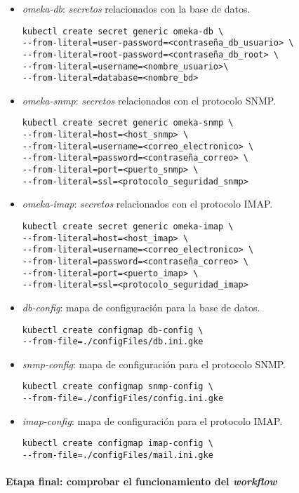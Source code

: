 \begin{itemize}
\tightlist
\item
  \emph{omeka-db}: \emph{secretos} relacionados con la base de datos.
  \begin{verbatim}
kubectl create secret generic omeka-db \
--from-literal=user-password=<contraseña_db_usuario> \
--from-literal=root-password=<contraseña_db_root> \
--from-literal=username=<nombre_usuario>\
--from-literal=database=<nombre_bd>
  \end{verbatim}
\item
  \emph{omeka-snmp}: \emph{secretos} relacionados con el protocolo SNMP.
    \begin{verbatim}
kubectl create secret generic omeka-snmp \
--from-literal=host=<host_snmp> \
--from-literal=username=<correo_electronico> \
--from-literal=password=<contraseña_correo> \
--from-literal=port=<puerto_snmp> \
--from-literal=ssl=<protocolo_seguridad_snmp>
  \end{verbatim}
\item
  \emph{omeka-imap}: \emph{secretos} relacionados con el protocolo IMAP.
    \begin{verbatim}
kubectl create secret generic omeka-imap \
--from-literal=host=<host_imap> \
--from-literal=username=<correo_electronico> \
--from-literal=password=<contraseña_correo> \
--from-literal=port=<puerto_imap> \
--from-literal=ssl=<protocolo_seguridad_imap>
  \end{verbatim}
  \item
  \emph{db-config}: mapa de configuración para la base de datos.
    \begin{verbatim}
kubectl create configmap db-config \
--from-file=./configFiles/db.ini.gke
  \end{verbatim}
    \item
  \emph{snmp-config}: mapa de configuración para el protocolo SNMP.
    \begin{verbatim}
kubectl create configmap snmp-config \
--from-file=./configFiles/config.ini.gke
  \end{verbatim}
      \item
  \emph{imap-config}: mapa de configuración para el protocolo IMAP.
    \begin{verbatim}
kubectl create configmap imap-config \
--from-file=./configFiles/mail.ini.gke
  \end{verbatim}
\end{itemize}


\paragraph{Etapa final: comprobar el funcionamiento del \emph{workflow}}

